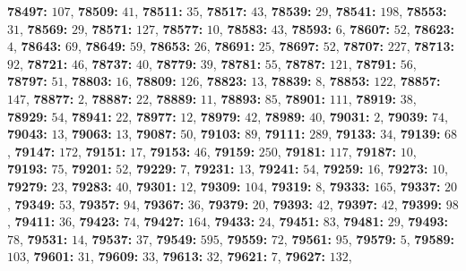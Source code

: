 \textsf{\bfseries 78497:} $107$, \textsf{\bfseries 78509:} $41$, \textsf{\bfseries 78511:} $35$, \textsf{\bfseries 78517:} $43$, \textsf{\bfseries 78539:} $29$, \textsf{\bfseries 78541:} $198$, \textsf{\bfseries 78553:} $31$, \textsf{\bfseries 78569:} $29$, \textsf{\bfseries 78571:} $127$, \textsf{\bfseries 78577:} $10$, \textsf{\bfseries 78583:} $43$, \textsf{\bfseries 78593:} $6$, \textsf{\bfseries 78607:} $52$, \textsf{\bfseries 78623:} $4$, \textsf{\bfseries 78643:} $69$, \textsf{\bfseries 78649:} $59$, \textsf{\bfseries 78653:} $26$, \textsf{\bfseries 78691:} $25$, \textsf{\bfseries 78697:} $52$, \textsf{\bfseries 78707:} $227$, \textsf{\bfseries 78713:} $92$, \textsf{\bfseries 78721:} $46$, \textsf{\bfseries 78737:} $40$, \textsf{\bfseries 78779:} $39$, \textsf{\bfseries 78781:} $55$, \textsf{\bfseries 78787:} $121$, \textsf{\bfseries 78791:} $56$, \textsf{\bfseries 78797:} $51$, \textsf{\bfseries 78803:} $16$, \textsf{\bfseries 78809:} $126$, \textsf{\bfseries 78823:} $13$, \textsf{\bfseries 78839:} $8$, \textsf{\bfseries 78853:} $122$, \textsf{\bfseries 78857:} $147$, \textsf{\bfseries 78877:} $2$, \textsf{\bfseries 78887:} $22$, \textsf{\bfseries 78889:} $11$, \textsf{\bfseries 78893:} $85$, \textsf{\bfseries 78901:} $111$, \textsf{\bfseries 78919:} $38$, \textsf{\bfseries 78929:} $54$, \textsf{\bfseries 78941:} $22$, \textsf{\bfseries 78977:} $12$, \textsf{\bfseries 78979:} $42$, \textsf{\bfseries 78989:} $40$, \textsf{\bfseries 79031:} $2$, \textsf{\bfseries 79039:} $74$, \textsf{\bfseries 79043:} $13$, \textsf{\bfseries 79063:} $13$, \textsf{\bfseries 79087:} $50$, \textsf{\bfseries 79103:} $89$, \textsf{\bfseries 79111:} $289$, \textsf{\bfseries 79133:} $34$, \textsf{\bfseries 79139:} $68$, \textsf{\bfseries 79147:} $172$, \textsf{\bfseries 79151:} $17$, \textsf{\bfseries 79153:} $46$, \textsf{\bfseries 79159:} $250$, \textsf{\bfseries 79181:} $117$, \textsf{\bfseries 79187:} $10$, \textsf{\bfseries 79193:} $75$, \textsf{\bfseries 79201:} $52$, \textsf{\bfseries 79229:} $7$, \textsf{\bfseries 79231:} $13$, \textsf{\bfseries 79241:} $54$, \textsf{\bfseries 79259:} $16$, \textsf{\bfseries 79273:} $10$, \textsf{\bfseries 79279:} $23$, \textsf{\bfseries 79283:} $40$, \textsf{\bfseries 79301:} $12$, \textsf{\bfseries 79309:} $104$, \textsf{\bfseries 79319:} $8$, \textsf{\bfseries 79333:} $165$, \textsf{\bfseries 79337:} $20$, \textsf{\bfseries 79349:} $53$, \textsf{\bfseries 79357:} $94$, \textsf{\bfseries 79367:} $36$, \textsf{\bfseries 79379:} $20$, \textsf{\bfseries 79393:} $42$, \textsf{\bfseries 79397:} $42$, \textsf{\bfseries 79399:} $98$, \textsf{\bfseries 79411:} $36$, \textsf{\bfseries 79423:} $74$, \textsf{\bfseries 79427:} $164$, \textsf{\bfseries 79433:} $24$, \textsf{\bfseries 79451:} $83$, \textsf{\bfseries 79481:} $29$, \textsf{\bfseries 79493:} $78$, \textsf{\bfseries 79531:} $14$, \textsf{\bfseries 79537:} $37$, \textsf{\bfseries 79549:} $595$, \textsf{\bfseries 79559:} $72$, \textsf{\bfseries 79561:} $95$, \textsf{\bfseries 79579:} $5$, \textsf{\bfseries 79589:} $103$, \textsf{\bfseries 79601:} $31$, \textsf{\bfseries 79609:} $33$, \textsf{\bfseries 79613:} $32$, \textsf{\bfseries 79621:} $7$, \textsf{\bfseries 79627:} $132$, 

